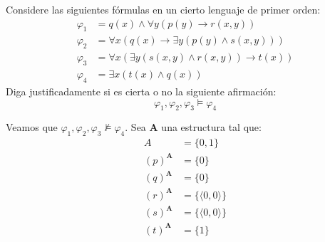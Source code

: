 \documentclass[12pt]{article}
\renewcommand{\bf}[1]{\mathbf{#1}}
\begin{document}
\begin{ejercicio}
    Considere las siguientes fórmulas en un cierto lenguaje de primer orden:
    \begin{align*}
        \varphi_1 & = q(x) \land \forall y\left( p(y) \rightarrow r(x,y) \right) \\
        \varphi_2 & = \forall x\left( q(x) \rightarrow \exists y\left( p(y) \land s(x,y) \right) \right) \\
        \varphi_3 & = \forall x\left( \exists y\left(s(x,y) \land r(x,y) \right) \rightarrow t(x) \right) \\
        \varphi_4 & = \exists x\left( t(x) \land q(x) \right)
    \end{align*}
    Diga justificadamente si es cierta o no la siguiente afirmación:
    \begin{equation*}
        \varphi_1, \varphi_2, \varphi_3 \models \varphi_4
    \end{equation*}

    Veamos que $\varphi_1, \varphi_2, \varphi_3 \not\models \varphi_4$.
    Sea $\bf{A}$ una estructura tal que:
    \begin{align*}
        A &= \{0,1\}\\
        (p)^{\bf{A}} &= \{0\}\\
        (q)^{\bf{A}} &= \{0\}\\
        (r)^{\bf{A}} &= \{\langle 0,0\rangle\}\\
        (s)^{\bf{A}} &= \{\langle 0,0\rangle\}\\
        (t)^{\bf{A}} &= \{1\}
    \end{align*}


\end{ejercicio}
\end{document}
